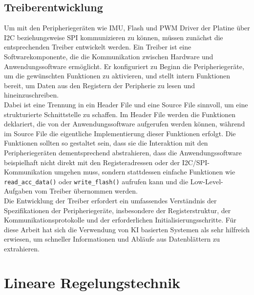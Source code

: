 \section{Treiberentwicklung}
\label{sec:treiberentwicklung}
Um mit den Peripheriegeräten wie IMU, Flash und PWM Driver der Platine über I2C beziehungsweise SPI kommunizieren zu können, müssen zunächst die entsprechenden Treiber entwickelt werden. Ein Treiber ist eine Softwarekomponente, die die Kommunikation zwischen Hardware und Anwendungssoftware ermöglicht. Er konfiguriert zu Beginn die Peripheriegeräte, um die gewünschten Funktionen zu aktivieren, und stellt intern Funktionen bereit, um Daten aus den Registern der Peripherie zu lesen und hineinzuschreiben.
\\
Dabei ist eine Trennung in ein Header File und eine Source File sinnvoll, um eine strukturierte Schnittstelle zu schaffen. Im Header File werden die Funktionen deklariert, die von der Anwendungssoftware aufgerufen werden können, während im Source File die eigentliche Implementierung dieser Funktionen erfolgt. Die Funktionen sollten so gestaltet sein, dass sie die Interaktion mit den Peripheriegeräten dementsprechend abstrahieren, dass die Anwendungssoftware beispielhaft nicht direkt mit den Registeradressen oder der I2C/SPI-Kommunikation umgehen muss, sondern stattdessen einfache Funktionen wie \texttt{read\_acc\_data()} oder \texttt{write\_flash()} aufrufen kann und die Low-Level-Aufgaben vom Treiber übernommen werden.
\\
Die Entwicklung der Treiber erfordert ein umfassendes Verständnis der Spezifikationen der Peripheriegeräte, insbesondere der Registerstruktur, der Kommunikationsprotokolle und der erforderlichen Initialisierungsschritte. Für diese Arbeit hat sich die Verwendung von KI basierten Systemen als sehr hilfreich erwiesen, um schneller Informationen und Abläufe aus Datenblättern zu extrahieren.



\chapter{Lineare Regelungstechnik}
\label{ch:regelungstechnik}





